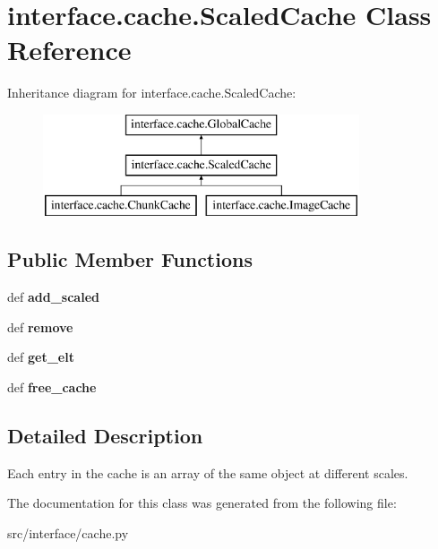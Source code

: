 \hypertarget{classinterface_1_1cache_1_1_scaled_cache}{\section{interface.\-cache.\-Scaled\-Cache \-Class \-Reference}
\label{classinterface_1_1cache_1_1_scaled_cache}
}
\-Inheritance diagram for interface.\-cache.\-Scaled\-Cache\-:\begin{figure}[H]
\begin{center}
\leavevmode
\includegraphics[height=3.000000cm]{classinterface_1_1cache_1_1_scaled_cache}
\end{center}
\end{figure}
\subsection*{\-Public \-Member \-Functions}
\begin{DoxyCompactItemize}
\item 
\hypertarget{classinterface_1_1cache_1_1_scaled_cache_ab7f44dd02e1f049ee4ceea02da0e70e0}{def {\bfseries add\-\_\-scaled}}\label{classinterface_1_1cache_1_1_scaled_cache_ab7f44dd02e1f049ee4ceea02da0e70e0}

\item 
\hypertarget{classinterface_1_1cache_1_1_scaled_cache_a66a6408691eb1620de6ed7f6b8fc4e77}{def {\bfseries remove}}\label{classinterface_1_1cache_1_1_scaled_cache_a66a6408691eb1620de6ed7f6b8fc4e77}

\item 
\hypertarget{classinterface_1_1cache_1_1_scaled_cache_a0a2104e6521edb1641c4db70a5326278}{def {\bfseries get\-\_\-elt}}\label{classinterface_1_1cache_1_1_scaled_cache_a0a2104e6521edb1641c4db70a5326278}

\item 
\hypertarget{classinterface_1_1cache_1_1_scaled_cache_a49373b4d908d75102df24d95cfb8778d}{def {\bfseries free\-\_\-cache}}\label{classinterface_1_1cache_1_1_scaled_cache_a49373b4d908d75102df24d95cfb8778d}

\end{DoxyCompactItemize}


\subsection{\-Detailed \-Description}
\begin{DoxyVerb}
Each entry in the cache is an array of the same object at
different scales.
\end{DoxyVerb}
 

\-The documentation for this class was generated from the following file\-:\begin{DoxyCompactItemize}
\item 
src/interface/cache.\-py\end{DoxyCompactItemize}

